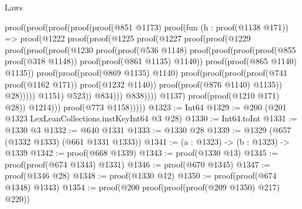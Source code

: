 \begin{lexlean}{Laws}
\begin{coremodule}
                  proof(proof(proof(proof(proof(@851 @1173)
                            proof(fun (h : proof(@1138 @171)) =>
                              proof(@1222
                                  proof(proof(@1225
                                        proof(@1227
                                            proof(proof(@1229
                                                  proof(proof(proof(@1230
                                                          proof(proof(@536 @1148)
                                                              proof(proof(proof(proof(@855
                                                                        proof(@318 @1148))
                                                                      proof(proof(@861 @1135)
                                                                          @1140))
                                                                    proof(proof(@865 @1140) @1135))
                                                                  proof(proof(proof(@869 @1135)
                                                                        @1140)
                                                                      proof(proof(proof(proof(@741
                                                                                proof(@1162 @171))
                                                                              proof(@1232 @1140))
                                                                            proof(proof(@876 @1140)
                                                                                @1135))
                                                                          @28)))))
                                                        @1151)
                                                      @523))
                                                @834)))
                                      @838))))
                          @1137)
                        proof(proof(@1210 @171) @28))
                      @1214)))
              proof(@773 @1158)))))
@1323 := Int64
@1329 := @200 (@201 @1323 LexLeanCollections.instKeyInt64 @3 @28)
@1330 := Int64.toInt
@1331 := @1330 @3
@1332 := @640 @1331
@1333 := @1330 @28
@1339 := @1329 (@657 (@1332 @1333) (@661 @1331 @1333))
@1341 := (a : @1323) -> (b : @1323) -> @1339
@1342 := proof(@668 @1339)
@1343 := proof(@1330 @13)
@1345 := proof(proof(@674 @1343) @1331)
@1346 := proof(@670 @1345)
@1347 := proof(@1346 @28)
@1348 := proof(@1330 @12)
@1350 := proof(proof(@674 @1348) @1343)
@1354 := proof(@200 proof(proof(proof(@209 @1350) @217) @220))

\end{coremodule}
\end{lexlean}
